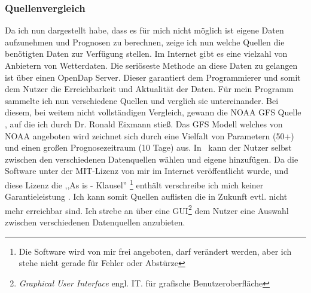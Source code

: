 \subsubsection{Quellenvergleich} %
Da ich nun dargestellt habe, dass es für mich nicht möglich ist
eigene Daten aufzunehmen und Prognosen zu berechnen,
zeige ich nun welche Quellen die benötigten Daten zur Verfügung stellen.
Im Internet gibt es eine vielzahl von Anbietern von Wetterdaten.
Die seriöseste Methode an diese Daten zu gelangen ist über einen OpenDap Server.
Dieser garantiert dem Programmierer und somit dem Nutzer
die Erreichbarkeit und Aktualität der Daten.
Für mein Programm sammelte ich nun verschiedene Quellen und verglich sie untereinander.
Bei diesem, bei weitem nicht vollständigen Vergleich,
gewann die NOAA GFS Quelle \cite{noaa} , auf die ich durch Dr. Ronald Eixmann stieß.
Das GFS \cite{gfs} Modell welches von NOAA angeboten wird zeichnet
sich durch eine Vielfalt von Parametern (50+) und einen großen Prognosezeitraum (10 Tage) aus.
In \vs\ kann der Nutzer selbst zwischen den verschiedenen Datenquellen wählen und eigene hinzufügen.
Da die Software unter der MIT-Lizenz von mir im Internet veröffentlicht wurde,
und diese Lizenz die ,,As is - Klausel''
\footnote{Die Software wird von mir frei angeboten, darf verändert werden,
aber ich stehe nicht gerade für Fehler oder Abstürze} enthält verschreibe
ich mich keiner Garantieleistung \cite{mitl}. Ich kann somit Quellen
auflisten die in Zukunft evtl. nicht mehr erreichbar sind.
Ich strebe an über eine GUI\footnote{\textit{Graphical User Interface} engl. IT.
für grafische Benutzeroberfläche} dem Nutzer eine Auswahl
zwischen verschiedenen Datenquellen anzubieten.


